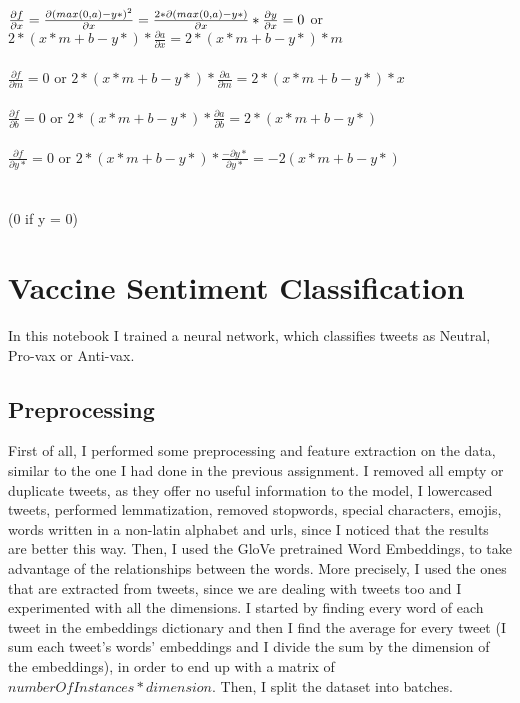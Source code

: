 \documentclass{article}
\begin{document}
$\frac {\partial f}{\partial x} = \frac {\partial (max(0,a)-y*)^2}{\partial x} =  \frac {2*\partial (max(0,a)-y*)}{\partial x}*\frac{\partial y}{\partial x} = \\ \\ 0$ or $2*(x*m+b-y*)*\frac {\partial a}{\partial x} = 2*(x*m+b-y*)*m $
\\ \\
$\frac {\partial f}{\partial m} = 0$ or $ 2*(x*m + b -y*)*\frac {\partial a}{\partial m} = 2*(x*m + b -y*)*x$ 
\\ \\
$\frac {\partial f}{\partial b} = 0$ or $2*(x*m + b -y*)*\frac {\partial a}{\partial b} = 2*(x*m +b-y*)$ 
\\ \\
$\frac {\partial f}{\partial y*} = 0$ or $2*(x*m + b -y*)*\frac {-\partial y*}{\partial y*} = -2(x*m + b -y*)$
\\ \\ \\
(0 if y = 0)
\newpage
\section{Vaccine Sentiment Classification}
In this notebook I trained a neural network, which classifies tweets as Neutral, Pro-vax or Anti-vax.
\subsection{Preprocessing}
First of all, I performed some preprocessing and feature extraction on the data, similar to the one I had done in the previous assignment. I removed all empty or duplicate tweets, as they offer no useful information to the model, I lowercased tweets, performed lemmatization, removed stopwords, special characters, emojis, words written in a non-latin alphabet and urls, since I noticed that the results are better this way. Then, I used the GloVe pretrained Word Embeddings, to take advantage of the relationships between the words. More precisely, I used the ones that are extracted from tweets, since we are dealing with tweets too and I experimented with all the dimensions. I started by finding every word of each tweet in the embeddings dictionary and then I find the average for every tweet (I sum each tweet's words' embeddings and I divide the sum by the dimension of the embeddings), in order to end up with a matrix of $numberOfInstances*dimension$. Then, I split the dataset into batches.
\\ \\ \\
\end{document}
